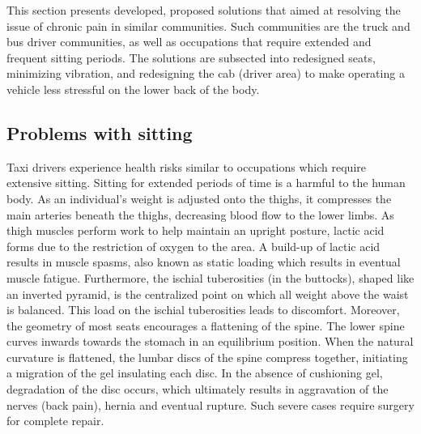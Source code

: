 \documentclass[11pt]{article}
\begin{document}
This section presents developed, proposed solutions that aimed at resolving the issue of
chronic pain in similar communities. Such communities are the truck and bus driver communities, as well as occupations 
that require extended and frequent sitting periods. The solutions are subsected into
redesigned seats, minimizing vibration, and redesigning the cab (driver area) to make operating a vehicle
less stressful on the lower back of the body.

\subsection{Problems with sitting}
\label{sec:sittingproblems}

Taxi drivers experience health risks similar to occupations which require extensive sitting. 
Sitting for extended periods of time is a harmful to the human body. As an individual's weight is adjusted
onto the thighs, it compresses the main arteries beneath the thighs, decreasing 
blood flow to the lower limbs. As thigh muscles perform work to help maintain an upright posture, 
lactic acid forms due to the restriction of oxygen to the area. A build-up of lactic acid results in muscle spasms, also known as static
loading which results in eventual muscle fatigue. Furthermore, the ischial 
tuberosities (in the buttocks), shaped like an inverted pyramid, is the centralized point on which all weight above the waist  
is balanced. This load on the ischial tuberosities leads to discomfort. Moreover, the geometry of most seats encourages a flattening of the 
spine. The lower spine curves inwards towards the stomach in an equilibrium position. When the natural curvature 
is flattened, the lumbar discs of the spine compress together, initiating a migration of 
the gel insulating each disc. In the absence of cushioning gel, degradation of the disc occurs, which 
ultimately results in aggravation of the nerves (back pain), hernia and eventual rupture. Such severe cases
require surgery for complete repair\cite{ergoCentricAnatomy2011}.
\end{document}
